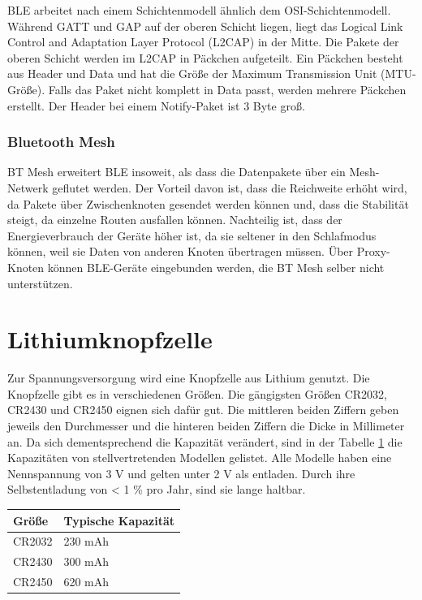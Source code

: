 BLE arbeitet nach einem Schichtenmodell ähnlich dem OSI-Schichtenmodell.
Während GATT und GAP auf der oberen Schicht liegen, liegt das Logical Link Control and Adaptation Layer Protocol (L2CAP) in der Mitte.
Die Pakete der oberen Schicht werden im L2CAP in Päckchen aufgeteilt.
Ein Päckchen besteht aus Header und Data und hat die Größe der Maximum Transmission Unit (MTU-Größe).
Falls das Paket nicht komplett in Data passt, werden mehrere Päckchen erstellt.
Der Header bei einem Notify-Paket ist 3 Byte groß. \cite{site_til2cap}

\subsubsection{Bluetooth Mesh}
BT Mesh erweitert BLE insoweit, als dass die Datenpakete über ein Mesh-Netwerk geflutet werden.
Der Vorteil davon ist, dass die Reichweite erhöht wird, da Pakete über Zwischenknoten gesendet werden können und, dass die Stabilität steigt, da einzelne Routen ausfallen können.
Nachteilig ist, dass der Energieverbrauch der Geräte höher ist, da sie seltener in den Schlafmodus können, weil sie Daten von anderen Knoten übertragen müssen.
Über Proxy-Knoten können BLE-Geräte eingebunden werden, die BT Mesh selber nicht unterstützen. \cite{site_mesh}

\section{Lithiumknopfzelle}
Zur Spannungsversorgung wird eine Knopfzelle aus Lithium genutzt.
Die Knopfzelle gibt es in verschiedenen Größen.
Die gängigsten Größen CR2032, CR2430 und CR2450 eignen sich dafür gut.
Die mittleren beiden Ziffern geben jeweils den Durchmesser und die hinteren beiden Ziffern die Dicke in Millimeter an.
Da sich dementsprechend die Kapazität verändert, sind in der Tabelle \ref{tab:knopfzellen} die Kapazitäten von stellvertretenden Modellen gelistet.
Alle Modelle haben eine Nennspannung von 3 V und gelten unter 2 V als entladen.
Durch ihre Selbstentladung von < 1 \% pro Jahr, sind sie lange haltbar. \cite{datasheet_ds6450}
\begin{table}[hbtp]
	\label{tab:knopfzellen}
	\centering
	\begin{tabular}{l|l}
		Größe & Typische Kapazität\\
		\hline
		CR2032 & 230 mAh \cite{datasheet_ds6032}\\
		CR2430 & 300 mAh \cite{datasheet_ds6430}\\
		CR2450 & 620 mAh \cite{datasheet_ds6450}\\
	\end{tabular}
\end{table}
